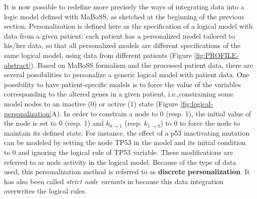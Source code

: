 \documentclass[a4paper,12pt,twoside,onecolumn,openright,final,oldfontcommands]{memoir}
\begin{document}
It is now possible to redefine more precisely the ways of integrating
data into a logic model defined with MaBoSS, as sketched at the
beginning of the previous section. Personalization is defined here as
the specification of a logical model with data from a given patient:
each patient has a personalized model tailored to his/her data, so that
all personalized models are different specifications of the same logical
model, using data from different patients (Figure
\ref{fig:PROFILE-abstract}). Based on MaBoSS formalism and the processed
patient data, there are several possibilities to personalize a generic
logical model with patient data. One possibility to have
patient-specific models is to force the value of the variables
corresponding to the altered genes in a given patient, i.e.,constraining
some model nodes to an inactive (\(0\)) or active (\(1\)) state (Figure
\ref{fig:logical-personalization}A). In order to constrain a node to 0
(resp. 1), the initial value of the node is set to 0 (resp. 1) and
\(k_{0\rightarrow 1}\) (resp. \(k_{1\rightarrow 0}\)) to 0 to force the
node to maintain its defined state. For instance, the effect of a p53
inactivating mutation can be modeled by setting the node TP53 in the
model and its initial condition to 0 and ignoring the logical rule of
TP53 variable. These modifications are referred to as node activity in
the logical model. Because of the type of data used, this
personalization method is referred to as \textbf{discrete
personalization}. It has also been called \emph{strict node variants} in
\citet{beal2019personalization} because this data integration overwrites
the logical rules.
\end{document}

